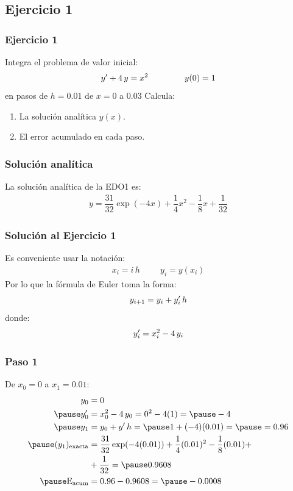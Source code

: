 \documentclass[12pt]{beamer}
\begin{document}
\subsection{Ejercicio 1}

\begin{frame}
\frametitle{Ejercicio 1}
Integra el problema de valor inicial:
\pause
\begin{align*}
{y}^{\prime} + 4 \, y = x^{2} \hspace{1.5cm} y(0) = 1
\end{align*}
en pasos de $h = 0.01$ de $x = 0$ a $0.03$
\pause
Calcula:
\begin{enumerate}[<+->]
\item La solución analítica $y (x)$.
\item El error acumulado en cada paso.
\end{enumerate}
\end{frame}
\begin{frame}
\frametitle{Solución analítica}
La solución analítica de la EDO1 es:
\pause
\begin{align*}
y =  \dfrac{31}{32} \exp(-4 x) + \dfrac{1}{4} x^{2} - \dfrac{1}{8} x + \dfrac{1}{32}
\end{align*}
\end{frame}
\begin{frame}
\frametitle{Solución al Ejercicio 1}
Es conveniente usar la notación:
\pause
\begin{align*}
x_{i} = i \, h \hspace{1cm} y_{i} = y (x_{i})
\end{align*}
\pause
Por lo que la fórmula de Euler toma la forma:
\pause
\begin{align*}
y_{i+1} = y_{i} + {y}^{\prime}_{i} \, h
\end{align*}
donde:
\begin{align*}
{y}^{\prime}_{i} = x_{i}^{2} - 4 \, y_{i}
\end{align*}
\end{frame}
\begin{frame}
\frametitle{Paso 1}
De $x_{0} = 0$ a $x_{1} = 0.01$:
\pause
\begin{eqnarray*}
\begin{aligned}
y_{0} &= 0 \\ \pause
\pderivada{y}_{0} &= x_{0}^{2} - 4 \, y_{0} = 0^{2} - 4 (1) = \pause - 4 \\ \pause
y_{1} &= y_{0} + \pderivada{y} \, h = \pause 1 + (-4)(0.01) = \pause = 0.96 \\ \pause
(y_{1})_{\text{exacta}} &= \dfrac{31}{32} \exp(-4 (0.01)) + \dfrac{1}{4} (0.01)^{2} - \dfrac{1}{8} (0.01) +  \\
&+ \dfrac{1}{32} = \pause 0.9608 \\ \pause
\text{E}_{\text{acum}} &= 0.96 - 0.9608 = \pause -0.0008
\end{aligned}
\end{eqnarray*}
\end{frame}
\end{document}
